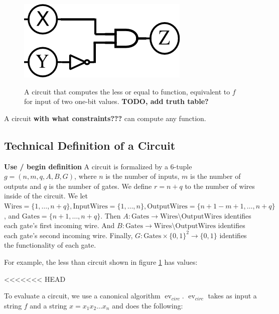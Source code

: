 \documentclass[12pt,twoside]{reedthesis}
\newcommand{\Gates}{\text{Gates}}
\newcommand{\InputWires}{\text{InputWires}}
\newcommand{\OutputWires}{\text{OutputWires}}
\newcommand{\Wires}{\text{Wires}}
\begin{document}
\begin{figure}[h]
    \centering
    \includegraphics[scale=0.75]{images/drawing.png}
    \label{fig:less_than_circuit}
    \caption{A circuit that computes the less or equal to function, equivalent to $f$ for input of two one-bit values. \textbf{TODO, add truth table?}}
\end{figure}

A circuit \textbf{with what constraints???} can compute any function.

\subsection{Technical Definition of a Circuit}
\textbf{Use / begin definition}
A circuit is formalized by a 6-tuple $g = (n,m,q,A,B,G)$, where $n$ is the number of inputs, $m$ is the number of outputs and $q$ is the number of gates.
We define $r = n + q$ to the number of wires inside of the circuit.
We let $\Wires = \{1,\ldots, n+q\}, \InputWires = \{1,\ldots, n\}, \OutputWires = \{n+1-m+1, \ldots,n+q\}$, and $\Gates = \{n+1, \ldots, n+q\}$.
Then $A : \Gates \to \Wires \setminus \OutputWires$ identifies each gate's first incoming wire.
And $B : \Gates \to \Wires \setminus \OutputWires$ identifies each gate's second incoming wire.
Finally, $G: \Gates \times \{0,1\}^2 \to \{0,1\}$ identifies the functionality of each gate.

For example, the less than circuit shown in figure \ref{fig:less_than_circuit} has values:

<<<<<<< HEAD
\newcommand{\Gb}{\operatorname{Gb}}
\newcommand{\En}{\operatorname{En}}
\newcommand{\De}{\operatorname{De}}
\newcommand{\Ev}{\operatorname{Ev}}
\newcommand{\ev}{\operatorname{ev}}
\newcommand{\evcirc}{\ev_{circ}}

\newcommand{\fbar}{f^-}
\newcommand{\Topo}{\operatorname{Topo}}
\renewcommand{\algorithmicrequire}{\textbf{Input:}}
\renewcommand{\algorithmicensure}{\textbf{Output:}}

To evaluate a circuit, we use a canonical algorithm $\evcirc$.
$\evcirc$ takes as input a string $f$ and a string $x = x_1 x_2 \ldots x_n$ and does the following:
\end{document}
